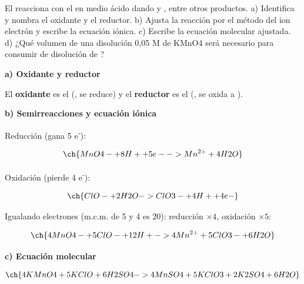 \begin{exerciseEVAU}
    El  reacciona con el  en medio ácido  dando  y , entre otros productos. a) Identifica y nombra el oxidante y el reductor. b) Ajusta la reacción por el método del ion electrón y escribe la ecuación iónica. c) Escribe la ecuación molecular ajustada. d) ¿Qué volumen de una disolución 0,05 M de KMnO4 será necesario para consumir  de disolución  de ?

    \begin{solu}


        \textbf{a) Oxidante y reductor}

        El \textbf{oxidante} es el  (, se reduce) y el \textbf{reductor} es el  (, se oxida a ).

        \textbf{b) Semirreacciones y ecuación iónica}

        Reducción (gana 5 e\textsuperscript{-}):

        \begin{equation*}
            \ch{MnO4- + 8 H+ + 5 e- -> Mn^{2+} + 4 H2O}
        \end{equation*}

        Oxidación (pierde 4 e\textsuperscript{-}):

        \begin{equation*}
            \ch{ClO- + 2 H2O -> ClO3- + 4 H+ + 4 e-}
        \end{equation*}

        Igualando electrones (m.c.m. de 5 y 4 es 20): reducción \(\times 4\), oxidación \(\times 5\):

        \begin{equation*}
            \ch{4 MnO4- + 5 ClO- + 12 H+ -> 4 Mn^{2+} + 5 ClO3- + 6 H2O}
        \end{equation*}

        \textbf{c) Ecuación molecular}

        \begin{equation*}
            \ch{4 KMnO4 + 5 KClO + 6 H2SO4 -> 4 MnSO4 + 5 KClO3 + 2 K2SO4 + 6 H2O}
        \end{equation*}


\end{solu}
\end{exerciseEVAU}
